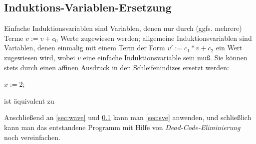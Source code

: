 \subsection{Induktions-Variablen-Ersetzung}
\label{sec:ive}

Einfache Induktionsvariablen sind Variablen, denen nur durch (ggfs.
mehrere) Terme $v := v + c_0$ Werte zugewiesen werden; allgemeine
Induktionsvariablen sind Variablen, denen einmalig mit einem Term der
Form $v':= c_1*v + c_2$ ein Wert zugewiesen wird, wobei $v$ eine
einfache Induktionsvariable sein muß.  Sie können stets durch einen
affinen Ausdruck in den Schleifenindizes
ersetzt werden:\\

\begin{minipage}[c]{4cm}
    \begin{algorithm}[H]
        \( x:= 2 \);\\
    \end{algorithm}
\end{minipage}
%
\begin{minipage}[c]{4cm}
\centerline{ist äquivalent zu}
\end{minipage}
%
\begin{minipage}[c]{4cm}
    \begin{algorithm}[H]
    \end{algorithm}
\end{minipage}

\bigskip
Anschließend an \ref{sec:wave} und \ref{sec:ive} kann man \ref{sec:sve}
anwenden, und schließlich kann man das entstandene Programm mit Hilfe von
\emph{Dead-Code-Eliminierung} noch vereinfachen.

 
\def\ins{\hspace{.5cm}}

